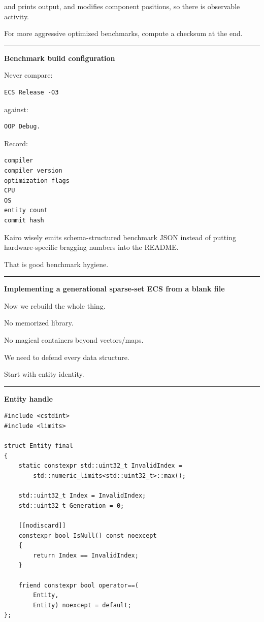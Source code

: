 and prints output, and modifies component positions, so there is observable activity.

For more aggressive optimized benchmarks, compute a checksum at the end.

\begin{center}\rule{0.5\linewidth}{0.5pt}\end{center}

\textbf{Benchmark build configuration}

Never compare:

\begin{verbatim}
ECS Release -O3
\end{verbatim}

against:

\begin{verbatim}
OOP Debug.
\end{verbatim}

Record:

\begin{verbatim}
compiler
compiler version
optimization flags
CPU
OS
entity count
commit hash
\end{verbatim}

Kairo wisely emits schema-structured benchmark JSON instead of putting hardware-specific bragging numbers into the README.

That is good benchmark hygiene.

\begin{center}\rule{0.5\linewidth}{0.5pt}\end{center}

\textbf{Implementing a generational sparse-set ECS from a blank file}

Now we rebuild the whole thing.

No memorized library.

No magical containers beyond vectors/maps.

We need to defend every data structure.

Start with entity identity.

\begin{center}\rule{0.5\linewidth}{0.5pt}\end{center}

\textbf{Entity handle}

\begin{verbatim}
#include <cstdint>
#include <limits>

struct Entity final
{
    static constexpr std::uint32_t InvalidIndex =
        std::numeric_limits<std::uint32_t>::max();

    std::uint32_t Index = InvalidIndex;
    std::uint32_t Generation = 0;

    [[nodiscard]]
    constexpr bool IsNull() const noexcept
    {
        return Index == InvalidIndex;
    }

    friend constexpr bool operator==(
        Entity,
        Entity) noexcept = default;
};
\end{verbatim}

